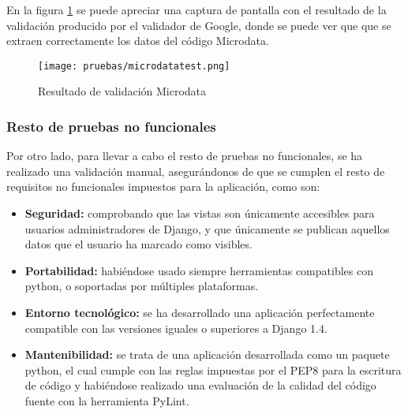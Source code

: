 En la figura \ref{fig:microdatatest} se puede apreciar una captura de pantalla
con el resultado de la validación producido por el validador de Google, donde se
puede ver que que se extraen correctamente los datos del código Microdata.

\newpage

\begin{figure}[H]
    \begin{center}
        \texttt{[image: pruebas/microdatatest.png]}
    \end{center}
    \caption{Resultado de validación Microdata}
    \label{fig:microdatatest}
\end{figure}

\subsubsection{Resto de pruebas no funcionales}

Por otro lado, para llevar a cabo el resto de pruebas no funcionales, se ha
realizado una validación manual, asegurándonos de que se cumplen el resto de
requisitos no funcionales impuestos para la aplicación, como son:
\begin{itemize}
    \item \textbf{Seguridad:} comprobando que las vistas son únicamente
        accesibles para usuarios administradores de Django, y que únicamente se
        publican aquellos datos que el usuario ha marcado como visibles.
    \item \textbf{Portabilidad:} habiéndose usado siempre herramientas
        compatibles con python, o soportadas por múltiples plataformas.
    \item \textbf{Entorno tecnológico:} se ha desarrollado una aplicación
        perfectamente compatible con las versiones iguales o superiores a Django
        1.4.
    \item \textbf{Mantenibilidad:} se trata de una aplicación desarrollada como
        un paquete python, el cual cumple con las reglas impuestas por el PEP8
        para la escritura de código y habiéndose realizado una evaluación de la
        calidad del código fuente con la herramienta PyLint.
\end{itemize}


